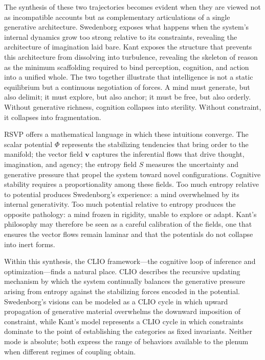 \documentclass[12pt]{article}
\begin{document}
The synthesis of these two trajectories becomes evident when they are viewed 
not as incompatible accounts but as complementary articulations of a single 
generative architecture. Swedenborg exposes what happens when the system’s 
internal dynamics grow too strong relative to its constraints, revealing the 
architecture of imagination laid bare. Kant exposes the structure that prevents 
this architecture from dissolving into turbulence, revealing the skeleton of 
reason as the minimum scaffolding required to bind perception, cognition, and 
action into a unified whole. The two together illustrate that intelligence is 
not a static equilibrium but a continuous negotiation of forces. A mind must 
generate, but also delimit; it must explore, but also anchor; it must be free, 
but also orderly. Without generative richness, cognition collapses into 
sterility. Without constraint, it collapses into fragmentation.

RSVP offers a mathematical language in which these intuitions converge. The 
scalar potential $\Phi$ represents the stabilizing tendencies that bring order 
to the manifold; the vector field $\mathbf{v}$ captures the inferential flows 
that drive thought, imagination, and agency; the entropy field $S$ measures the 
uncertainty and generative pressure that propel the system toward novel 
configurations. Cognitive stability requires a proportionality among these 
fields. Too much entropy relative to potential produces Swedenborg’s 
experience: a mind overwhelmed by its internal generativity. Too much 
potential relative to entropy produces the opposite pathology: a mind frozen in 
rigidity, unable to explore or adapt. Kant’s philosophy may therefore be seen 
as a careful calibration of the fields, one that ensures the vector flows 
remain laminar and that the potentials do not collapse into inert forms.

Within this synthesis, the CLIO framework—the cognitive loop of inference and 
optimization—finds a natural place. CLIO describes the recursive updating 
mechanism by which the system continually balances the generative pressure 
arising from entropy against the stabilizing forces encoded in the potential.  
Swedenborg’s visions can be modeled as a CLIO cycle in which upward 
propagation of generative material overwhelms the downward imposition of 
constraint, while Kant’s model represents a CLIO cycle in which constraints 
dominate to the point of establishing the categories as fixed invariants.  
Neither mode is absolute; both express the range of behaviors available to the 
plenum when different regimes of coupling obtain.
\end{document}
